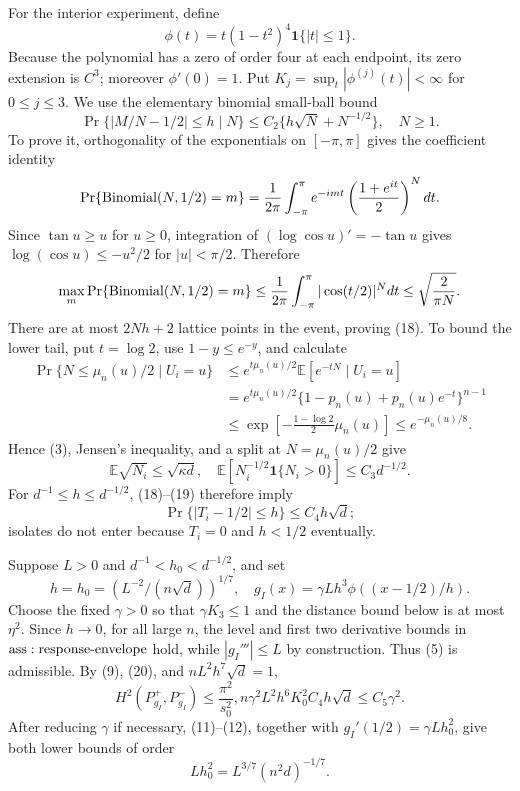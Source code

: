 For the interior experiment, define
\[
 \phi(t)=t(1-t^2)^4\mathbf1\{|t|\leq1\}.
\tag{17}
\]
Because the polynomial has a zero of order four at each endpoint, its zero extension is \(C^3\); moreover \(\phi'(0)=1\).  Put \(K_j=\sup_t|\phi^{(j)}(t)|<\infty\) for \(0\leq j\leq3\).  We use the elementary binomial small-ball bound
\[
 \Pr\{|M/N-1/2|\leq h\mid N\}
 \leq C_2\{h\sqrt N+N^{-1/2}\},\quad N\geq1.
\tag{18}
\]
To prove it, orthogonality of the exponentials on \([-\pi,\pi]\) gives the coefficient identity
\[
 \Pr\{{\rm Binomial}(N,1/2)=m\}
 =\frac1{2\pi}\int_{-\pi}^{\pi}
 e^{-imt}\left(\frac{1+e^{it}}2\right)^Ndt.
\]
Since \(\tan u\geq u\) for \(u\geq0\), integration of \((\log\cos u)'=-\tan u\) gives \(\log(\cos u)\leq-u^2/2\) for \(|u|<\pi/2\).  Therefore
\[
 \max_m\Pr\{{\rm Binomial}(N,1/2)=m\}
 \leq\frac1{2\pi}\int_{-\pi}^{\pi}|\cos(t/2)|^Ndt
 \leq\sqrt{\frac2{\pi N}}.
\]
There are at most \(2Nh+2\) lattice points in the event, proving (18).  To bound the lower tail, put \(t=\log2\), use \(1-y\leq e^{-y}\), and calculate
\[
\begin{aligned}
 \Pr\{N\leq\mu_n(u)/2\mid U_i=u\}
 &\leq e^{t\mu_n(u)/2}\mathbb E[e^{-tN}\mid U_i=u]\\
 &=e^{t\mu_n(u)/2}\{1-p_n(u)+p_n(u)e^{-t}\}^{n-1}\\
 &\leq\exp\!\left[-\frac{1-\log2}{2}\mu_n(u)\right]
 \leq e^{-\mu_n(u)/8}.
\end{aligned}
\]
Hence (3), Jensen's inequality, and a split at \(N=\mu_n(u)/2\) give
\[
 \mathbb E\sqrt{N_i}\leq\sqrt{\kappa d},
 \quad
 \mathbb E[N_i^{-1/2}\mathbf1\{N_i>0\}]\leq C_3d^{-1/2}.
\tag{19}
\]
For \(d^{-1}\leq h\leq d^{-1/2}\), (18)--(19) therefore imply
\[
 \Pr\{|T_i-1/2|\leq h\}\leq C_4h\sqrt d;
\tag{20}
\]
isolates do not enter because \(T_i=0\) and \(h<1/2\) eventually.

Suppose \(L>0\) and \(d^{-1}<h_0<d^{-1/2}\), and set
\[
 h=h_0=(L^{-2}/(n\sqrt d))^{1/7},
 \quad g_I(x)=\gamma Lh^3\phi((x-1/2)/h).
\tag{21}
\]
Choose the fixed \(\gamma>0\) so that \(\gamma K_3\leq1\) and the distance bound below is at most \(\eta^2\).  Since \(h\to0\), for all large \(n\), the level and first two derivative bounds in \({\rm ass:response\text{-}envelope}\) hold, while \(|g_I'''|\leq L\) by construction.  Thus (5) is admissible.  By (9), (20), and \(nL^2h^7\sqrt d=1\),
\[
 H^2(P_{g_I}^+,P_{g_I}^-)
 \leq\frac{\pi^2}{s_0^2},n\gamma^2L^2h^6K_0^2C_4h\sqrt d
 \leq C_5\gamma^2.
\tag{22}
\]
After reducing \(\gamma\) if necessary, (11)--(12), together with \(g_I'(1/2)=\gamma Lh_0^2\), give both lower bounds of order
\[
 Lh_0^2=L^{3/7}(n^2d)^{-1/7}.
\tag{23}
\]

